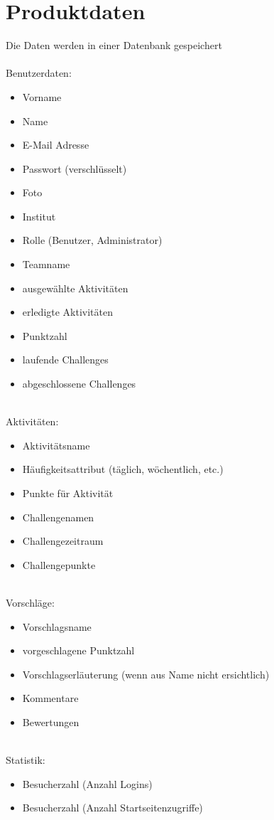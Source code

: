 \section{Produktdaten}
Die Daten werden in einer Datenbank gespeichert \\
\\
Benutzerdaten: 
\begin{itemize}
\item Vorname
\item Name
\item E-Mail Adresse
\item Passwort (verschlüsselt)
\item Foto
\item Institut
\item Rolle (Benutzer, Administrator)
\item Teamname
\item ausgewählte Aktivitäten
\item erledigte Aktivitäten
\item Punktzahl
\item laufende Challenges
\item abgeschlossene Challenges
\end{itemize}
\\
Aktivitäten: 
\begin{itemize}
\item Aktivitätsname
\item Häufigkeitsattribut (täglich, wöchentlich, etc.)
\item Punkte für Aktivität
\item Challengenamen
\item Challengezeitraum
\item Challengepunkte
\end{itemize}
\\
Vorschläge:
\begin{itemize}
\item Vorschlagsname
\item vorgeschlagene Punktzahl
\item Vorschlagserläuterung (wenn aus Name nicht ersichtlich)
\item Kommentare
\item Bewertungen
\end{itemize}
\\
Statistik:
\begin{itemize}
\item Besucherzahl (Anzahl Logins)
\item Besucherzahl (Anzahl Startseitenzugriffe)
\end{itemize}





